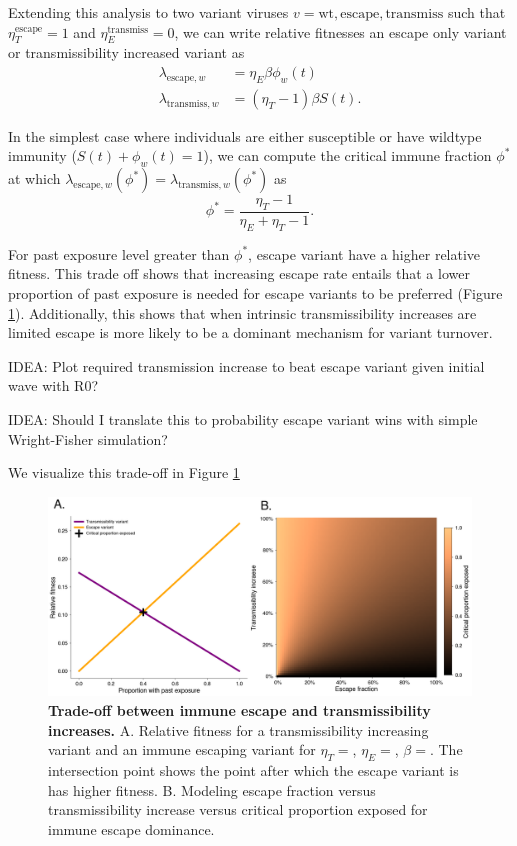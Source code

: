 \documentclass[12pt,oneside,letterpaper]{article}
\newcommand{\wt}{\text{wt}}
\newcommand{\varE}{\text{escape}}
\newcommand{\varT}{\text{transmiss}}
\begin{document}
Extending this analysis to two variant viruses $v= \wt, \varE, \varT$ such that $\eta_{T}^{\varE} = 1$ and $\eta_{E}^{\varT} = 0$, we can write relative fitnesses an escape only variant or transmissibility increased variant as
\begin{align*}
    \lambda_{\varE, w} &= \eta_{E} \beta \phi_{w}(t)\\
    \lambda_{\varT, w} &= (\eta_{T} - 1) \beta S(t).
\end{align*}

In the simplest case where individuals are either susceptible or have wildtype immunity ($S(t) + \phi_{w}(t) = 1$), we can compute the critical immune fraction $\phi^{*}$ at which $\lambda_{\varE, w}(\phi^{*}) = \lambda_{\varT, w}(\phi^{*})$ as
\begin{equation} \label{eq:critical_immunity}
    \phi^{*} = \frac{\eta_{T} - 1}{\eta_{E} + \eta_{T} - 1}.
\end{equation}

For past exposure level greater than $\phi^{*}$, escape variant have a higher relative fitness.
This trade off shows that increasing escape rate entails that a lower proportion of past exposure is needed for escape variants to be preferred (Figure \ref{fig:transmission_tradeoff}). 
Additionally, this shows that when intrinsic transmissibility increases are limited escape is more likely to be a dominant mechanism for variant turnover.

IDEA: Plot required transmission increase to beat escape variant given initial wave with R0?

IDEA: Should I translate this to probability escape variant wins with simple Wright-Fisher simulation?


We visualize this trade-off in Figure \ref{fig:transmission_tradeoff}

\begin{figure}[h]
    \centering
    \includegraphics[width=0.8\linewidth]{./figures/transmission_tradeoff.png}
    \caption{\textbf{Trade-off between immune escape and transmissibility increases.} 
    A. Relative fitness for a transmissibility increasing variant and an immune escaping variant for $\eta_{T}=$, $\eta_{E}=$, $\beta=$. 
    The intersection point shows the point after which the escape variant is has higher fitness. 
    B. Modeling escape fraction versus transmissibility increase versus critical proportion exposed for immune escape dominance.}%
    \label{fig:transmission_tradeoff}
\end{figure}
\end{document}
